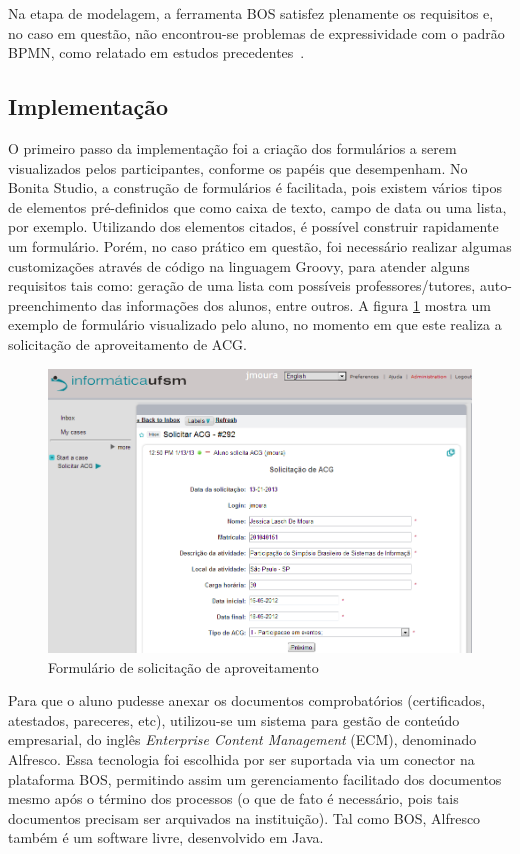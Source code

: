 \documentclass[12pt]{article}
\begin{document}
Na etapa de modelagem, a ferramenta BOS satisfez plenamente os requisitos e, no caso em questão, não encontrou-se problemas de expressividade com o padrão BPMN, como relatado em estudos precedentes~\cite{recker2006, muehlen2008}.

\subsection{Implementação}


O primeiro passo da implementação foi a criação dos formulários a serem visualizados pelos participantes, conforme os papéis que desempenham. No Bonita Studio, a construção de formulários é facilitada, pois existem vários tipos de elementos pré-definidos que como caixa de texto, campo de data ou uma lista, por exemplo. Utilizando dos elementos citados, é possível construir rapidamente um formulário. Porém, no caso prático em questão, foi necessário realizar algumas customizações através de código na linguagem Groovy, para atender alguns requisitos tais como: geração de uma lista com possíveis professores/tutores, auto-preenchimento das informações dos alunos, entre outros. A figura \ref{fig:form}  mostra um exemplo de formulário visualizado pelo aluno, no momento em que este realiza a solicitação de aproveitamento de ACG.

\begin{figure}[ht]
\centering
\includegraphics[width=.9\textwidth]{images/formSolicitacao.png}
\caption{Formulário de solicitação de aproveitamento}
\label{fig:form}
\end{figure}

Para que o aluno pudesse anexar os documentos comprobatórios (certificados, atestados, pareceres, etc), utilizou-se um sistema para gestão de conteúdo empresarial, do inglês \emph{Enterprise Content Management} (ECM), denominado Alfresco. Essa tecnologia foi escolhida por ser suportada via um conector na plataforma BOS, permitindo assim um gerenciamento facilitado dos documentos mesmo após o término dos processos (o que de fato é necessário, pois tais documentos precisam ser arquivados na instituição). Tal como BOS, Alfresco também é um software livre, desenvolvido em Java.
\end{document}
